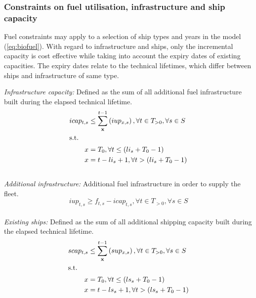 \documentclass[article]{elsarticle}
\begin{document}
\subsubsection{Constraints on fuel utilisation, infrastructure and ship capacity}
Fuel constraints may apply to a selection of ship types and years in the model (\autoref{eq:biofuel}). With regard to infrastructure and ships, only the incremental capacity is cost effective while taking into account the expiry dates of existing capacities. The expiry dates relate to the technical lifetimes, which differ between ships and infrastructure of same type.\\\par\noindent
\textit{Infrastructure capacity: }Defined as the sum of all additional fuel infrastructure built during the elapsed technical lifetime.
\begin{subequations}
    \begin{align}
        icap_{t,s} &\leq \sum_{\textbf{x}}^{t-1} \left( iup_{x,s} \right), \forall t \in T_{>0}, \forall s \in S\label{eq:icap}\\
        \intertext{s.t.}
        x &= T_0, \forall t \leq \left(li_{s} + T_0 - 1\right)\\
        x &= t - li_{s} + 1, \forall t > \left(li_{s} + T_0 - 1\right)
    \end{align}
\end{subequations}\\
\textit{Additional infrastructure: }Additional fuel infrastructure in order to supply the fleet.
\begin{equation}
    iup_{t,s} \geq f_{t,s} - icap_{t,s}, \forall t \in T_{>0}, \forall s \in S\label{eq:iup}
\end{equation}\\
\textit{Existing ships: }Defined as the sum of all additional shipping capacity built during the elapsed technical lifetime.
\begin{subequations}
    \begin{align}
        scap_{t,s} &\leq \sum_{\textbf{x}}^{t-1} \left(sup_{x,s} \right), \forall t \in T_{>0}, \forall s \in S\label{eq:scap}\\
        \intertext{s.t.}
        x &= T_0, \forall t \leq \left(ls_{s} + T_0 - 1\right)\\
        x &= t - ls_{s} + 1, \forall t > \left(ls_{s} + T_0 - 1\right)
    \end{align}
\end{subequations}\\
\end{document}
